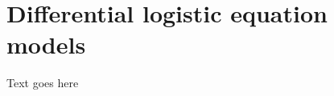 \chapter{Differential logistic equation models}

\ifpdf
    \graphicspath{{Chapter3/Figs/Raster/}{Chapter3/Figs/PDF/}{Chapter3/Figs/}}
\else
    \graphicspath{{Chapter3/Figs/Vector/}{Chapter3/Figs/}}
\fi

Text goes here